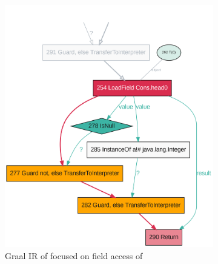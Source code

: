 \begin{figure}
	\centering
	\begin{subfigure}[b]{0.4\textwidth}
		\centering
		\includegraphics[width=\textwidth]{figures/dot/List.head.boxed.TruffleTier.png}
		\caption{Graal IR of  focused on field access of }
		\label{graalir:cons-head-boxed}
	\end{subfigure}
	\hfill
	\begin{subfigure}[b]{0.45\textwidth}
		\centering

\end{subfigure}
\end{figure}
